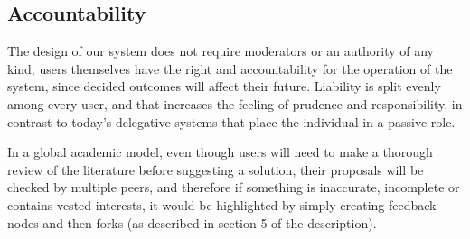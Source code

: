 \documentclass[a4paper,11pt]{article}
\begin{document}
\begin{multicols}{2}
\subsection{Accountability} \label{accountability}

The design of our system does not require moderators or an authority of any kind; users themselves have the right and accountability for the operation of the system, since decided outcomes will affect their future. Liability is split evenly among every user, and that increases the feeling of prudence and responsibility, in contrast to today's delegative systems that place the individual in a passive role.

In a global academic model, even though users will need to make a thorough review of the literature before suggesting a solution, their proposals will be checked by multiple peers, and therefore if something is inaccurate, incomplete or contains vested interests, it would be highlighted by simply creating feedback nodes and then forks (as described in section 5 of the description).

\end{multicols}
\end{document}
